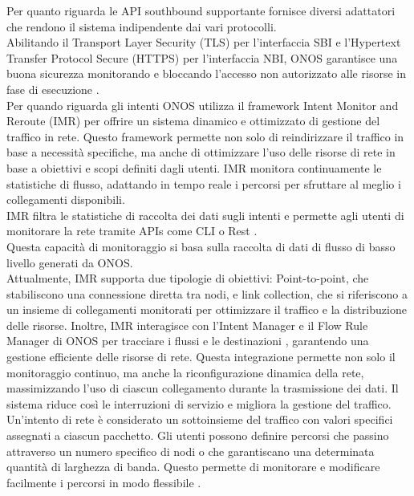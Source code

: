 Per quanto riguarda le API southbound supportante fornisce diversi adattatori che rendono il sistema indipendente dai vari protocolli.
\\Abilitando il Transport Layer Security (TLS) per l'interfaccia SBI e l'Hypertext Transfer Protocol Secure (HTTPS) per l'interfaccia NBI, 
ONOS garantisce una buona sicurezza monitorando e bloccando l'accesso non autorizzato alle risorse in fase di esecuzione \cite{artONOS}.
\\Per quando riguarda gli intenti ONOS utilizza il framework Intent Monitor and Reroute (IMR) per offrire un sistema dinamico e ottimizzato di gestione del traffico in rete.
Questo framework permette non solo di reindirizzare il traffico in base a necessità specifiche, ma anche di ottimizzare l'uso delle risorse di rete in base a obiettivi e scopi definiti dagli utenti.
IMR monitora continuamente le statistiche di flusso, adattando in tempo reale i percorsi per sfruttare al meglio i collegamenti disponibili.
\\IMR filtra le statistiche di raccolta dei dati sugli intenti e permette agli utenti di monitorare la rete tramite APIs come CLI o Rest \cite{ONOSart}. 
\\Questa capacità di monitoraggio si basa sulla raccolta di dati di flusso di basso livello generati da ONOS. 
\\Attualmente, IMR supporta due tipologie di obiettivi: Point-to-point, che stabiliscono una connessione diretta tra nodi, e 
link collection, che si riferiscono a un insieme di collegamenti monitorati per ottimizzare il traffico e la distribuzione delle risorse.
Inoltre, IMR interagisce con l'Intent Manager e il Flow Rule Manager di ONOS per tracciare i flussi e le destinazioni \cite{onosint}, garantendo una gestione efficiente delle risorse di rete. 
Questa integrazione permette non solo il monitoraggio continuo, ma anche la riconfigurazione dinamica della rete, massimizzando l'uso di ciascun collegamento durante la trasmissione dei dati.
Il sistema riduce così le interruzioni di servizio e migliora la gestione del traffico.
\\Un'intento di rete è considerato un sottoinsieme del traffico con valori specifici assegnati a ciascun pacchetto.
Gli utenti possono definire percorsi che passino attraverso un numero specifico di nodi o che garantiscano una determinata quantità di larghezza di banda. 
Questo permette di monitorare e modificare facilmente i percorsi in modo flessibile \cite{ONOSart}.
